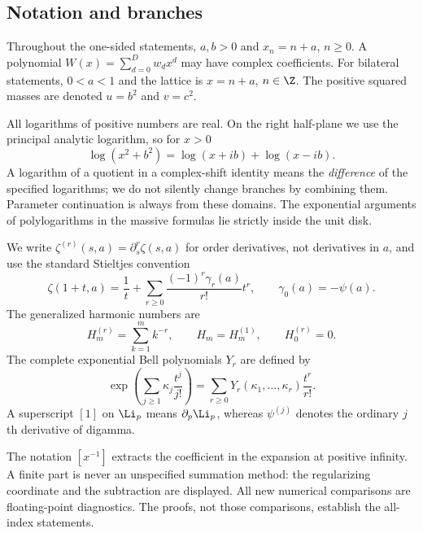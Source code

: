 \subsection{Notation and branches}
Throughout the one-sided statements, $a,b>0$ and $x_n=n+a$, $n\ge0$.
A polynomial $W(x)=\sum_{d=0}^{D}w_dx^d$ may have complex coefficients.
For bilateral statements, $0<a<1$ and the lattice is $x=n+a$, $n\in\Z$.
The positive squared masses are denoted $u=b^2$ and $v=c^2$.

All logarithms of positive numbers are real. On the right half-plane
we use the principal analytic logarithm, so for $x>0$
\[
\log(x^2+b^2)=\log(x+ib)+\log(x-ib).
\]
A logarithm of a quotient in a complex-shift identity means the
\emph{difference} of the specified logarithms; we do not silently change
branches by combining them. Parameter continuation is always from these
domains. The exponential arguments of polylogarithms in the massive
formulas lie strictly inside the unit disk.

We write $\zeta^{(r)}(s,a)=\partial_s^r\zeta(s,a)$ for order derivatives,
not derivatives in $a$, and use the standard Stieltjes convention
\begin{equation}\label{hqj:eq:stieltjes}
\zeta(1+t,a)=\frac1t+\sum_{r\ge0}\frac{(-1)^r\gamma_r(a)}{r!}t^r,
\qquad \gamma_0(a)=-\psi(a).
\end{equation}
The generalized harmonic numbers are
\[
H_m^{(r)}=\sum_{k=1}^m k^{-r},\qquad H_m=H_m^{(1)},\qquad H_0^{(r)}=0.
\]
The complete exponential Bell polynomials $Y_r$ are defined by
\begin{equation}\label{hqj:eq:bell}
\exp\left(\sum_{j\ge1}\kappa_j\frac{t^j}{j!}\right)
=\sum_{r\ge0}Y_r(\kappa_1,\ldots,\kappa_r)\frac{t^r}{r!}.
\end{equation}
A superscript $[1]$ on $\Li_p$ means $\partial_p\Li_p$, whereas
$\psi^{(j)}$ denotes the ordinary $j$th derivative of digamma.

The notation $[x^{-1}]$ extracts the coefficient in the expansion at
positive infinity. A finite part is never an unspecified summation
method: the regularizing coordinate and the subtraction are displayed.
All new numerical comparisons are floating-point diagnostics. The
proofs, not those comparisons, establish the all-index statements.
